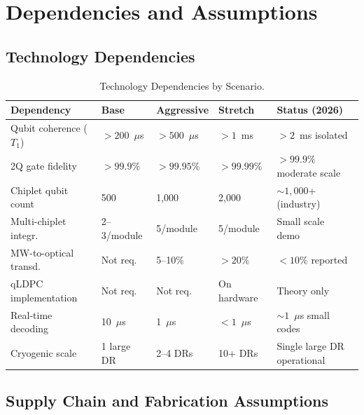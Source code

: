 \documentclass[conference]{IEEEtran}
\begin{document}
\section{Dependencies and Assumptions}

\subsection{Technology Dependencies}

\begin{table}[htbp]
\centering
\caption{Technology Dependencies by Scenario.}
\label{tab:tech_deps}
\begin{tabular}{lllll}
\toprule
\textbf{Dependency} & \textbf{Base} & \textbf{Aggressive} & \textbf{Stretch} & \textbf{Status (2026)} \\
\midrule
Qubit coherence ($T_1$) & $> 200$~$\mu$s & $> 500$~$\mu$s & $> 1$~ms & $> 2$~ms isolated~\cite{bland2025} \\
2Q gate fidelity & $> 99.9\%$ & $> 99.95\%$ & $> 99.99\%$ & $> 99.9\%$ moderate scale~\cite{acharya2024} \\
Chiplet qubit count & 500 & 1,000 & 2,000 & ${\sim}1{,}000$+ (industry) \\
Multi-chiplet integr. & 2--3/module & 5/module & 5/module & Small scale demo~\cite{ibm2024b} \\
MW-to-optical transd. & Not req. & 5--10\% & $> 20\%$ & $< 10\%$ reported \\
qLDPC implementation & Not req. & Not req. & On hardware & Theory only~\cite{bravyi2024, panteleev2022} \\
Real-time decoding & 10~$\mu$s & 1~$\mu$s & $< 1$~$\mu$s & ${\sim}1$~$\mu$s small codes \\
Cryogenic scale & 1 large DR & 2--4 DRs & 10+ DRs & Single large DR operational \\
\bottomrule
\end{tabular}
\end{table}

\subsection{Supply Chain and Fabrication Assumptions}
\end{document}
